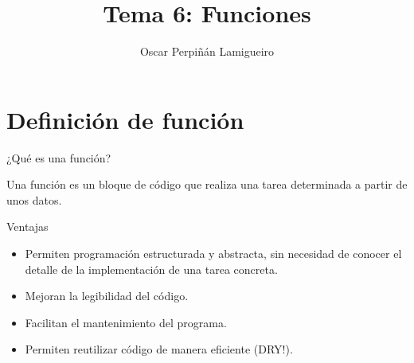 \documentclass[xcolor={usenames,svgnames,dvipsnames}, aspectratio=169]{beamer}
\author{Oscar Perpiñán Lamigueiro}
\date{}
\title{Tema 6: Funciones}
\begin{document}
\maketitle

\section{Definición de función}
\label{sec:org11397a3}
\begin{frame}[label={sec:org359f385}]{¿Qué es una función?}
\begin{block}{}
Una función es un bloque de código que realiza una tarea determinada a partir de unos datos.
\end{block}
\begin{block}{Ventajas}
\begin{itemize}
\item Permiten \alert{programación estructurada y abstracta}, sin necesidad de conocer
el detalle de la implementación de una tarea concreta.
\item Mejoran la \alert{legibilidad} del código.
\item Facilitan el \alert{mantenimiento} del programa.
\item Permiten \alert{reutilizar código} de manera eficiente (\alert{DRY!}).
\end{itemize}
\end{block}
\end{frame}
\end{document}
